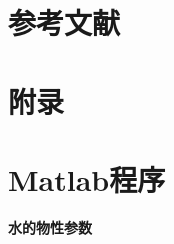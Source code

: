 \documentclass{article}
\begin{document}
 \section{参考文献}
	
	
    
    
    
    
    
    
    
    
    
    
    
    
    
    
    \section{附录}
 	\appendix
 	\section{Matlab程序}
 	\textbf{水的物性参数}
\end{document}
